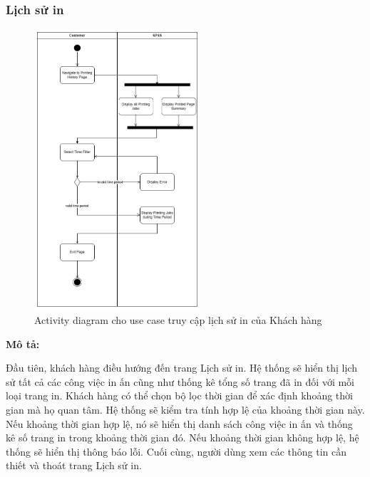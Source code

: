 \subsubsection{Lịch sử in}
\begin{figure}[H]
    \begin{center}
        \includegraphics[width=0.55\textwidth]{Images/System Modelling/Logging(customer)_Activity.png}
        \caption{Activity diagram cho use case truy cập lịch sử in của Khách hàng}
        \label{fig:arch}
    \end{center}
\end{figure}
\textbf{Mô tả:}\par
Đầu tiên, khách hàng điều hướng đến trang Lịch sử in. Hệ thống sẽ hiển thị lịch sử tất cả các công việc in ấn cũng như thống kê tổng số trang đã in đối với mỗi loại trang in. Khách hàng có thể chọn bộ lọc thời gian để xác định khoảng thời gian mà họ quan tâm. Hệ thống sẽ kiểm tra tính hợp lệ của khoảng thời gian này. Nếu khoảng thời gian hợp lệ, nó sẽ hiển thị danh sách công việc in ấn và thống kê số trang in trong khoảng thời gian đó. Nếu khoảng thời gian không hợp lệ, hệ thống sẽ hiển thị thông báo lỗi. Cuối cùng, người dùng xem các thông tin cần thiết và thoát trang Lịch sử in.

